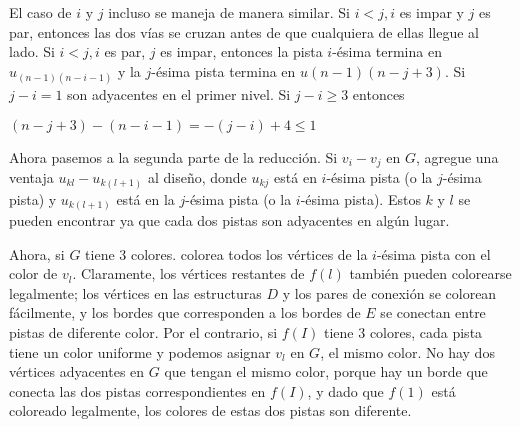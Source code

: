 El caso de $i$ y $j$ incluso se maneja de manera similar.
Si $i <j, i$ es impar y $j$ es par, entonces las dos vías se cruzan antes de que cualquiera de ellas llegue al lado.
Si $i < j, i$ es par, $j$ es impar, entonces la pista $i$-ésima termina en $ u_{(n-1)(n-i-1)}$ y la $j$-ésima 
pista termina en $u(n-1)(n-j+3)$. Si $j - i = 1$ son adyacentes en el primer nivel. Si $j - i \geq 3$ entonces

$ (n- j + 3) - (n - i -1) = -(j - i) + 4 \leq 1 $

Ahora pasemos a la segunda parte de la reducción. Si $v_{i} - v_{j}$ en $G$, agregue una ventaja 
$u_{kl} - u_{k(l+1)}$ al diseño, donde $u_{kj}$ está en $ i$-ésima pista (o la $j$-ésima pista) y 
$u_{k(l +1)}$ está en la $j$-ésima pista (o la $i$-ésima pista). Estos $k$ y $l$ se pueden encontrar ya que cada 
dos pistas son adyacentes en algún lugar.


Ahora, si $G$ tiene 3 colores. colorea todos los vértices de la $i$-ésima pista con el color de $v_{l}$. 
Claramente, los vértices restantes de $f(l)$ también pueden colorearse legalmente; los vértices en las 
estructuras $D$ y los pares de conexión se colorean fácilmente, y los bordes que corresponden a los bordes 
de $E$ se conectan entre pistas de diferente color. Por el contrario, si $f(I)$ tiene 3 colores, cada pista 
tiene un color uniforme y podemos asignar $v_{l}$ en $G$, el mismo color. No hay dos vértices adyacentes 
en $G$ que tengan el mismo color, porque hay un borde que conecta las dos pistas correspondientes en $f(I)$, 
y dado que $f(1)$ está coloreado legalmente, los colores de estas dos pistas son diferente.